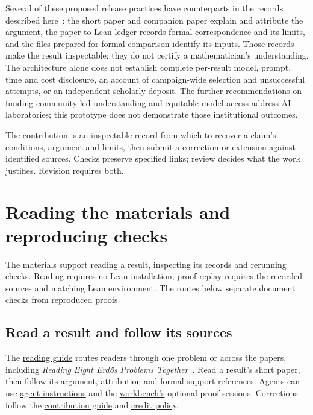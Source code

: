 \documentclass[10pt]{article}
\newcommand{\repobase}{https://github.com/wcook04/plectis-erdos}
\newcommand{\reporef}[2]{\href{\repobase/blob/992cf60a27efd8c34f437e347c413bb781d75c32/#1}{#2}}
\begin{document}
Several of these proposed release practices have counterparts in the
records described here~\cite[Section 2.B, Step I]{agmai2026}: the short
paper and companion paper explain and attribute the argument, the paper-to-Lean
ledger records formal correspondence and its limits, and the files prepared for formal comparison identify its inputs.
Those records make the result inspectable; they do not certify a
mathematician's understanding. The architecture alone does not establish
complete per-result model, prompt, time and cost disclosure, an account of
campaign-wide selection and unsuccessful attempts, or an independent
scholarly deposit. The further recommendations on funding community-led
understanding and equitable model access address AI laboratories; this
prototype does not demonstrate those institutional outcomes.

The contribution is an inspectable record from which to recover a claim's conditions, argument and limits, then submit a correction or extension against identified sources. Checks preserve specified links; review decides what the work justifies. Revision requires both.

\FloatBarrier
\appendix
\section{Reading the materials and reproducing checks}\label{app:repro}

The materials support reading a result, inspecting its records and rerunning checks. Reading requires no Lean installation; proof replay requires the recorded sources and matching Lean environment. The routes below separate document checks from reproduced proofs.

\subsection{Read a result and follow its sources}

The \reporef{docs/READING_GUIDE.md}{reading guide} routes readers through one problem or across the papers, including \emph{Reading Eight Erd\H{o}s Problems Together}~\cite{synthesis}. Read a result's short paper, then follow its argument, attribution and formal-support references. Agents can use \reporef{AGENTS.md}{agent instructions} and the \reporef{docs/agents/AGENT_WORKBENCH.md}{workbench's} optional proof sessions. Corrections follow the \reporef{CONTRIBUTING.md}{contribution guide} and \reporef{docs/research-commons/CREDIT_POLICY.md}{credit policy}.
\end{document}
